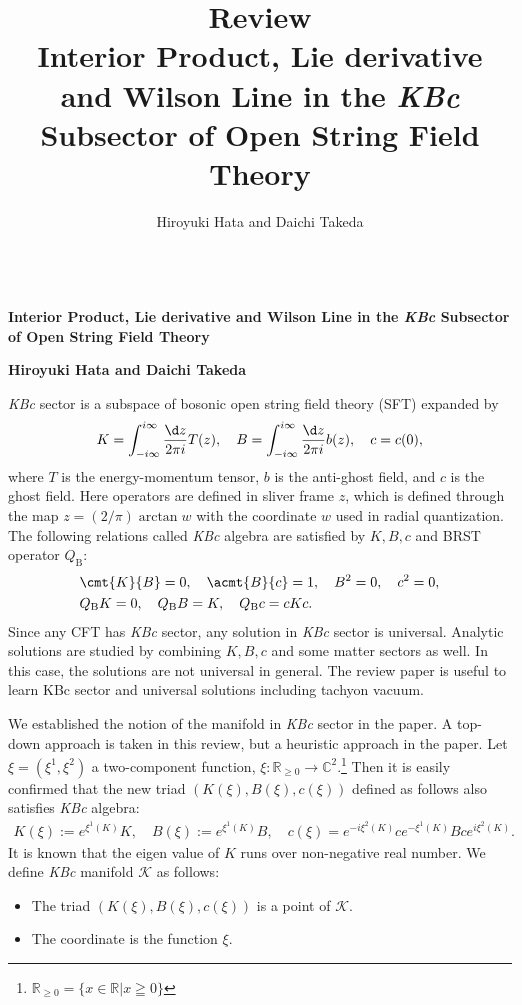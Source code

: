 \documentclass[12pt]{article}
\title{\textbf{Review}\\
Interior Product, Lie derivative and Wilson Line in the \textit{KBc} Subsector of Open String Field Theory
}
\author{Hiroyuki Hata and Daichi Takeda}
\date{}
\renewcommand{\thefootnote}{\fnsymbol{footnote}}
\begin{document}
{\Large{}\\[2mm]
\textbf{Interior Product, Lie derivative and Wilson Line in the \textit{KBc} Subsector of Open String Field Theory
}
}

\noindent
\hfill\textbf{Hiroyuki Hata and Daichi Takeda}

\renewcommand{\thefootnote}{\arabic{footnote})}
\setcounter{footnote}{0}
\vspace{12pt}
\textit{KBc} sector is a subspace of bosonic open string field theory (SFT) expanded by
\begin{align}
	K = \int_{-i\infty}^{i\infty}\frac{\d z}{2\pi i}T(z),\quad
	B =  \int_{-i\infty}^{i\infty}\frac{\d z}{2\pi i}b(z),\quad 
	c = c(0),
\end{align}
where $T$ is the energy-momentum tensor, $b$ is the anti-ghost field, and $c$ is the ghost field.
Here operators are defined in sliver frame $z$, which is defined through the map $z = (2/\pi)\arctan w$ with the coordinate $w$ used in radial quantization.
The following relations called \textit{KBc} algebra are satisfied by $K,B,c$ and BRST operator $Q_\mathrm{B}$:
\begin{align}
	&\cmt{K}{B} = 0,\quad
	\acmt{B}{c} = 1,\quad
	B^2 = 0,\quad
	c^2 = 0,\\
	&Q_\mathrm{B}K = 0,\quad
	Q_\mathrm{B}B = K,\quad
	Q_\mathrm{B}c = cKc.
\end{align}
Since any CFT has \textit{KBc} sector, any solution in \textit{KBc} sector is universal.
Analytic solutions are studied by combining $K,B,c$ and some matter sectors as well.
In this case, the solutions are not universal in general.
The review paper \cite{Okawa:2012ica} is useful to learn KBc sector and universal solutions including tachyon vacuum.

We established the notion of the manifold in \textit{KBc} sector in the paper.
A top-down approach is taken in this review, but a heuristic approach in the paper.
Let $\xi = (\xi^1,\xi^2)$ a two-component function, $\xi:\mathbb R_{\ge 0}\to \mathbb C^2$.\footnote{$\mathbb R_{\ge 0} = \{x\in\mathbb R|x\geqq 0\}$}
Then it is easily confirmed that the new triad $(K(\xi),B(\xi),c(\xi))$ defined as follows also satisfies \textit{KBc} algebra:
\begin{align}
	K(\xi) := e^{\xi^1(K)}K,\quad B(\xi) := e^{\xi^1(K)}B,\quad c(\xi) = e^{-i\xi^2(K)}ce^{-\xi^1(K)}Bce^{i\xi^2(K)}.
\end{align}
It is known that the eigen value of $K$ runs over non-negative real number.
We define \textit{KBc} manifold $\mathcal K$ as follows:
\begin{itemize}
	\item The triad $(K(\xi),B(\xi),c(\xi))$ is a point of $\mathcal K$.
	\item The coordinate is the function $\xi$.
\end{itemize}
\end{document}
